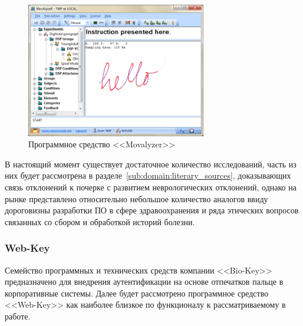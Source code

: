 \begin{figure}[ht]
    \centering
    \includegraphics[width=0.7\textwidth]{figures/movalyzer.png}
    \caption{Программное средство <<Movalyzer>>}
    \label{fig:domain:analogs:movalyzer}
\end{figure}

В настоящий момент существует достаточное количество исследований, часть из них будет рассмотрена в разделе~\ref{sub:domain:literary_sources}, доказывающих связь отклонений к почерке с развитием неврологических отклонений, однако на рынке представлено относительно небольшое количество аналогов ввиду дороговизны разработки ПО в сфере здравоохранения и ряда этических вопросов связанных со сбором и обработкой историй болезни.

\subsubsection{Web-Key}
\label{sub:domain:analogs:biokey}
Семейство программных и технических средств компании <<Bio-Key>>~\cite{analogs_biokey} предназначено для внедрения аутентификации на основе отпечатков пальце в корпоративные системы. Далее будет рассмотрено программное средство <<Web-Key>> как наиболее близкое по функционалу к рассматриваемому в работе.

